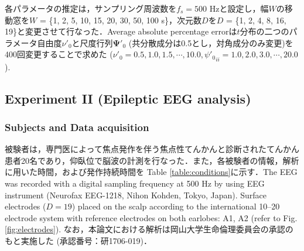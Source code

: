 \documentclass[journal]{IEEEtran}
\begin{document}
各パラメータの推定は，サンプリング周波数を$f_s=500$ Hzと設定し，幅$W$の移動窓を$W$ = \{1, 2, 5, 10, 15, 20, 30, 50, 100 s\}，次元数$D$を$D$ = \{1, 2, 4, 8, 16, 19\}と変更させて行なった．Average absolute percentage errorは$t$分布の二つのパラメータ自由度$\nu'_0$と尺度行列$\mathbf{\Psi}'_0$ (共分散成分は0.5とし，対角成分のみ変更)を400回変更することで求めた ($\nu'_0=0.5,1.0,1.5,\cdots,10.0, {\psi'_0}_{ii} =1.0, 2.0, 3.0,\cdots, 20.0$).

\subsection{Experiment II (Epileptic EEG analysis)}
\subsubsection{Subjects and Data acquisition}
被験者は，専門医によって焦点発作を伴う焦点性てんかんと診断されたてんかん患者20名であり，仰臥位で脳波の計測を行なった．また，各被験者の情報，解析に用いた時間，および発作持続時間を Table \ref{table:conditions}に示す．The EEG was recorded with a digital sampling frequency at 500 Hz by using EEG instrument (Neurofax EEG-1218, Nihon Kohden, Tokyo, Japan). Surface electrodes ($D=19$) placed on the scalp according to the international 10--20 electrode system with reference electrodes on both earlobes: A1, A2 (refer to Fig. \ref{fig:electrodes}).
なお，本論文における解析は岡山大学生命倫理委員会の承認のもと実施した (承認番号：研1706-019)．
\end{document}
